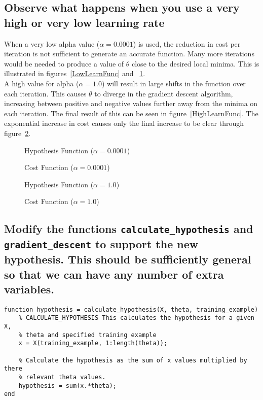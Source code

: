 \documentclass[titlepage]{scrartcl}
\newcommand{\code}[1]{\texttt{#1}}
\begin{document}
\subsection{Observe what happens when you use a very high or very low learning
rate}
When a very low alpha value ($\alpha=0.0001$) is used, the reduction in cost
per iteration is not sufficient to generate an accurate function. Many more
iterations would be needed to produce a value of $\theta$ close to the desired
local minima. This is illustrated in figures~\ref{LowLearnFunc} and
~\ref{LowLearnCost}.\\

A high value for alpha ($\alpha=1.0$) will result in large shifts in the
function over each iteration. This causes $\theta$ to diverge in the gradient
descent algorithm, increasing between positive and negative values further away
from the minima on each iteration. The final result of this can be seen in
figure~\ref{HighLearnFunc}. The exponential increase in cost causes only the
final increase to be clear through figure~\ref{HighLearnCost}.

\begin{figure}
    \caption{Hypothesis Function ($\alpha=0.0001$)}
    \label{LowLearnFunc}
    \caption{Cost Function ($\alpha=0.0001$)}
    \label{LowLearnCost}
\end{figure}

\begin{figure}
    \caption{Hypothesis Function ($\alpha=1.0$)}
    \label{HighLearnFunc}
    \caption{Cost Function ($\alpha=1.0$)}
    \label{HighLearnCost}
\end{figure}

\subsection{Modify the functions \code{calculate\_hypothesis} and
    \code{gradient\_descent} to support the new hypothesis. This should be
    sufficiently general so that we can have any number of extra variables.}
\begin{lstlisting}
function hypothesis = calculate_hypothesis(X, theta, training_example)
    % CALCULATE_HYPOTHESIS This calculates the hypothesis for a given X,
    % theta and specified training example
    x = X(training_example, 1:length(theta));

    % Calculate the hypothesis as the sum of x values multiplied by there
    % relevant theta values.
    hypothesis = sum(x.*theta);
end
\end{lstlisting}\leavevmode \\
\end{document}
